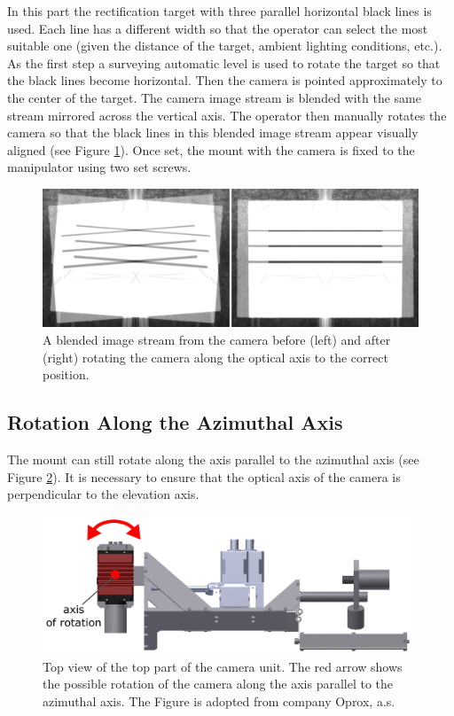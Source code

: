 In this part the rectification target with three parallel horizontal black lines is used. Each line has a different width so that the operator can select the most suitable one (given the distance of the target, ambient lighting conditions, etc.). As the first step a surveying automatic level is used to rotate the target so that the black lines become horizontal. Then the camera is pointed approximately to the center of the target. The camera image stream is blended with the same stream mirrored across the vertical axis. The operator then manually rotates the camera so that the black lines in this blended image stream appear visually aligned (see Figure \ref{fig:rect_mirrored_stream}). Once set, the mount with the camera is fixed to the manipulator using two set screws.

\begin{figure}[htb]
	\centering
	\includegraphics[width=12cm]{fig/rect_mirrored_stream.png}
	\caption{A blended image stream from the camera before (left) and after (right) rotating the camera along the optical axis to the correct position.}
	\label{fig:rect_mirrored_stream}
\end{figure}

\subsection{Rotation Along the Azimuthal Axis}

The mount can still rotate along the axis parallel to the azimuthal axis (see Figure \ref{fig:rect_model_top_view}). It is necessary to ensure that the optical axis of the camera is perpendicular to the elevation axis. 

\begin{figure}[htb]
	\centering
	\includegraphics[width=11cm]{fig/rect_model_top_view.png}
	\caption{Top view of the top part of the camera unit. The red arrow shows the possible rotation of the camera along the axis parallel to the azimuthal axis. The Figure is adopted from company Oprox, a.s.}
	\label{fig:rect_model_top_view}
\end{figure}

